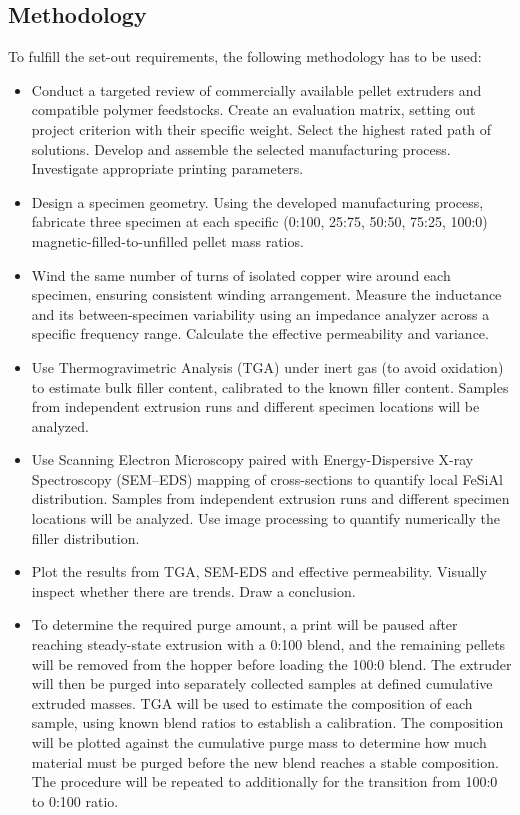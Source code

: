 \subsection{Methodology}
To fulfill the set-out requirements, the following methodology has to be used:
\begin{itemize}
  \item Conduct a targeted review of commercially available pellet extruders and compatible polymer feedstocks. Create an evaluation matrix, setting out project criterion with their specific weight. Select the highest rated path of solutions. Develop and assemble the selected manufacturing process. Investigate appropriate printing parameters.
  \item Design a specimen geometry. Using the developed manufacturing process, fabricate three specimen at each specific (0:100, 25:75, 50:50, 75:25, 100:0) magnetic-filled-to-unfilled pellet mass ratios.
  \item Wind the same number of turns of isolated copper wire around each specimen, ensuring consistent winding arrangement. Measure the inductance and its between-specimen variability using an impedance analyzer across a specific frequency range. Calculate the effective permeability and variance.
  \item Use Thermogravimetric Analysis (TGA) under inert gas (to avoid oxidation) to estimate bulk filler content, calibrated to the known filler content. Samples from independent extrusion runs and different specimen locations will be analyzed.
  \item Use Scanning Electron Microscopy paired with Energy-Dispersive X-ray Spectroscopy (SEM–EDS) mapping of cross-sections to quantify local FeSiAl distribution. Samples from independent extrusion runs and different specimen locations will be analyzed. Use image processing to quantify numerically the filler distribution.
  \item Plot the results from TGA, SEM-EDS and effective permeability. Visually inspect whether there are trends. Draw a conclusion.
  \item To determine the required purge amount, a print will be paused after reaching steady-state extrusion with a 0:100 blend, and the remaining pellets will be removed from the hopper before loading the 100:0 blend. The extruder will then be purged into separately collected samples at defined cumulative extruded masses. TGA will be used to estimate the composition of each sample, using known blend ratios to establish a calibration. The composition will be plotted against the cumulative purge mass to determine how much material must be purged before the new blend reaches a stable composition. The procedure will be repeated to additionally for the transition from 100:0 to 0:100 ratio.

\end{itemize}
